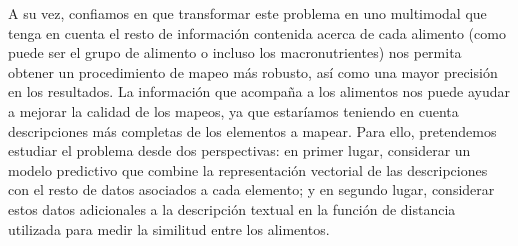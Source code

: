 A su vez, confiamos en que transformar este problema en uno multimodal que tenga en cuenta el resto de información contenida acerca de cada alimento (como puede ser el grupo de alimento o incluso los macronutrientes) nos permita obtener un procedimiento de mapeo más robusto, así como una mayor precisión en los resultados. La información que acompaña a los alimentos nos puede ayudar a mejorar la calidad de los mapeos, ya que estaríamos teniendo en cuenta descripciones más completas de los elementos a mapear. Para ello, pretendemos estudiar el problema desde dos perspectivas: en primer lugar, considerar un modelo predictivo que combine la representación vectorial de las descripciones con el resto de datos asociados a cada elemento; y en segundo lugar, considerar estos datos adicionales a la descripción textual en la función de distancia utilizada para medir la similitud entre los alimentos. 
 
